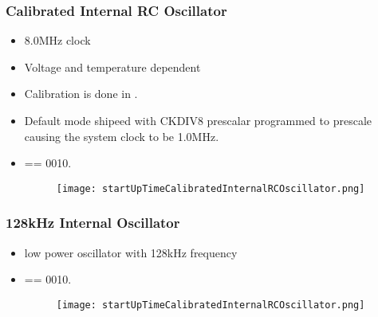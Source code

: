 \documentclass{article}
\begin{document}
\subsubsection{Calibrated Internal RC Oscillator}
\begin{itemize}
    \item 8.0MHz clock
    \item Voltage and temperature dependent
    \item Calibration is done in .
    \item Default mode shipeed with CKDIV8 prescalar programmed to prescale causing the system clock to be 1.0MHz.
    \item {} == 0010.
          \begin{figure}[H]
              \begin{center}
                  \texttt{[image: startUpTimeCalibratedInternalRCOscillator.png]}
              \end{center}
          \end{figure}
\end{itemize}

\subsubsection{128kHz Internal Oscillator}
\begin{itemize}
    \item low power oscillator with 128kHz frequency
    \item {} == 0010.
          \begin{figure}[H]
              \begin{center}
                  \texttt{[image: startUpTimeCalibratedInternalRCOscillator.png]}
              \end{center}
          \end{figure}
\end{itemize}
\end{document}
